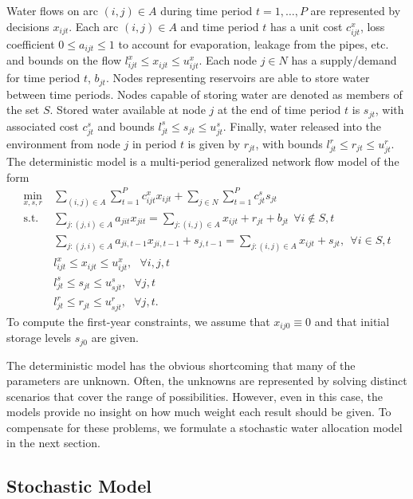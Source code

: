 \documentclass[11pt]{article}
\theoremstyle{plain}
\theoremstyle{definition}
\theoremstyle{remark}
\newcommand{\st}{\mbox{s.t.}}
\begin{document}
Water flows on arc $(i,j) \in A$ during time period $t = 1, \dots, P$ are represented by decisions $x_{ijt}$.
Each arc $(i,j) \in A$ and time period $t$ has a unit cost $c_{ijt}^x$, loss coefficient $0 \leq a_{ijt} \leq 1$ to account for evaporation, leakage from the pipes, etc. and bounds on the flow $l_{ijt}^x \leq x_{ijt} \leq u_{ijt}^x$.
Each node $j \in N$ has a supply/demand for time period $t$, $b_{jt}$.
Nodes representing reservoirs are able to store water between time periods.
Nodes capable of storing water are denoted as members of the set $S$.
Stored water available at node $j$ at the end of time period $t$ is $s_{jt}$, with associated cost $c_{jt}^s$ and bounds $l_{jt}^s \leq s_{jt} \leq u_{jt}^s$.
Finally, water released into the environment from node $j$ in period $t$ is given by $r_{jt}$, with bounds $l_{jt}^r \leq r_{jt} \leq u_{jt}^r$.
The deterministic model is a multi-period generalized network flow model of the form
\begin{align*}
	\min_{x,s,r} \ & \sum_{(i,j) \in A} \sum_{t=1}^P c_{ijt}^x x_{ijt} + \sum_{j \in N} \sum_{t=1}^P c_{jt}^s s_{jt} \\
	\st \ & \sum_{j : (j,i) \in A} a_{jit} x_{jit} = \sum_{j : (i,j) \in A} x_{ijt} + r_{jt} + b_{jt} \ \ \forall i \not\in S, t \\
	& \sum_{j : (j,i) \in A} a_{ji,t-1} x_{ji,t-1} + s_{j,t-1} = \sum_{j : (i,j) \in A} x_{ijt} + s_{jt}, \ \ \forall i \in S,t \\
	& l_{ijt}^x \leq x_{ijt} \leq u_{ijt}^x,\ \ \ \forall i,j,t \\
	& l_{jt}^s \leq s_{jt} \leq u_{sjt}^s, \ \ \ \forall j,t \\
	& l_{jt}^r \leq r_{jt} \leq u_{sjt}^r, \ \ \ \forall j,t.
\end{align*}
To compute the first-year constraints, we assume that $x_{ij0} \equiv 0$ and that initial storage levels $s_{j0}$ are given.

The deterministic model has the obvious shortcoming that many of the parameters are unknown.
Often, the unknowns are represented by solving distinct scenarios that cover the range of possibilities.
However, even in this case, the models provide no insight on how much weight each result should be given.
To compensate for these problems, we formulate a stochastic water allocation model in the next section.

\subsection{Stochastic Model}
\end{document}
